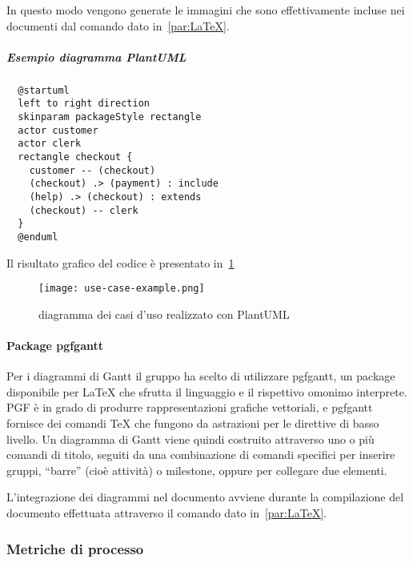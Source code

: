 \documentclass[../../norme-di-progetto.tex]{subfiles}
\begin{document}
In questo modo vengono generate le immagini che sono effettivamente incluse nei documenti dal comando dato in~\ref{par:LaTeX}.

\subparagraph{Esempio diagramma PlantUML}%
\label{subp:esempio_diagramma_plantuml}

\begin{verbatim}
  @startuml
  left to right direction
  skinparam packageStyle rectangle
  actor customer
  actor clerk
  rectangle checkout {
    customer -- (checkout)
    (checkout) .> (payment) : include
    (help) .> (checkout) : extends
    (checkout) -- clerk
  }
  @enduml
\end{verbatim}

Il risultato grafico del codice è presentato in~\ref{fig:esempio_caso_duso}

\begin{figure}[H]%
  \label{fig:esempio_caso_duso}
  \texttt{[image: use-case-example.png]}
  \centering
  \caption{diagramma dei casi d'uso realizzato con PlantUML}
\end{figure}


\paragraph{Package pgfgantt}%
\label{par:pgfgantt}

Per i diagrammi di Gantt il gruppo ha scelto di utilizzare pgfgantt, un package disponibile per \LaTeX{} che sfrutta il linguaggio  e il rispettivo omonimo interprete.
PGF è in grado di produrre rappresentazioni grafiche vettoriali, e pgfgantt fornisce dei comandi \TeX{} che fungono da astrazioni per le direttive di basso livello.
Un diagramma di Gantt viene quindi costruito attraverso uno o più comandi di titolo, seguiti da una combinazione di comandi specifici per inserire gruppi, ``barre'' (cioè attività) o milestone, oppure per collegare due elementi.

L'integrazione dei diagrammi nel documento avviene durante la compilazione del documento effettuata attraverso il comando dato in~\ref{par:LaTeX}.


\subsubsection{Metriche di processo}%
\label{subs:sviluppo/metriche_di_processo}
\end{document}
